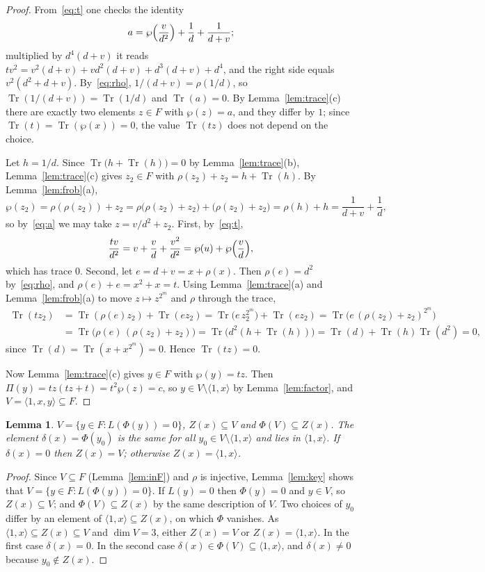 \documentclass[11pt,a4paper,reqno]{amsart}
\newtheorem{lemma}[theorem]{Lemma}
\theoremstyle{remark}
\numberwithin{equation}{section}
\newcommand{\Tr}{\operatorname{Tr}}
\begin{document}
\begin{proof}
From~\eqref{eq:t} one checks the identity
\begin{equation}\label{eq:a}
a=\wp\Bigl(\frac{v}{d^2}\Bigr)+\frac1d+\frac1{d+v};
\end{equation}
multiplied by $d^4(d+v)$ it reads $tv^2=v^2(d+v)+vd^2(d+v)+d^3(d+v)+d^4$, and the right side equals $v^2(d^2+d+v)$. By~\eqref{eq:rho}, $1/(d+v)=\rho(1/d)$, so $\Tr(1/(d+v))=\Tr(1/d)$ and $\Tr(a)=0$. By Lemma~\ref{lem:trace}(c) there are exactly two elements $z\in F$ with $\wp(z)=a$, and they differ by $1$; since $\Tr(t)=\Tr(\wp(x))=0$, the value $\Tr(tz)$ does not depend on the choice.

Let $h=1/d$. Since $\Tr\bigl(h+\Tr(h)\bigr)=0$ by Lemma~\ref{lem:trace}(b), Lemma~\ref{lem:trace}(c) gives $z_2\in F$ with $\rho(z_2)+z_2=h+\Tr(h)$. By Lemma~\ref{lem:frob}(a),
\[
\wp(z_2)=\rho(\rho(z_2))+z_2=\rho\bigl(\rho(z_2)+z_2\bigr)+\bigl(\rho(z_2)+z_2\bigr)=\rho(h)+h=\frac1{d+v}+\frac1d ,
\]
so by~\eqref{eq:a} we may take $z=v/d^2+z_2$. First, by~\eqref{eq:t},
\[
\frac{tv}{d^2}=v+\frac vd+\frac{v^2}{d^2}=\wp(u)+\wp\Bigl(\frac vd\Bigr),
\]
which has trace $0$. Second, let $e=d+v=x+\rho(x)$. Then $\rho(e)=d^2$ by~\eqref{eq:rho}, and $\rho(e)+e=x^2+x=t$. Using Lemma~\ref{lem:trace}(a) and Lemma~\ref{lem:frob}(a) to move $z\mapsto z^{2^m}$ and $\rho$ through the trace,
\begin{align*}
\Tr(tz_2)&=\Tr(\rho(e)z_2)+\Tr(ez_2)=\Tr\bigl(e\,z_2^{2^m}\bigr)+\Tr(ez_2)=\Tr\bigl(e\,(\rho(z_2)+z_2)^{2^m}\bigr)\\
&=\Tr\bigl(\rho(e)\,(\rho(z_2)+z_2)\bigr)=\Tr\bigl(d^2(h+\Tr(h))\bigr)=\Tr(d)+\Tr(h)\Tr(d^2)=0,
\end{align*}
since $\Tr(d)=\Tr(x+x^{2^m})=0$. Hence $\Tr(tz)=0$.

Now Lemma~\ref{lem:trace}(c) gives $y\in F$ with $\wp(y)=tz$. Then $\Pi(y)=tz(tz+t)=t^2\wp(z)=c$, so $y\in V\setminus\langle1,x\rangle$ by Lemma~\ref{lem:factor}, and $V=\langle1,x,y\rangle\subseteq F$.
\end{proof}

\begin{lemma}\label{lem:delta}
$V=\{y\in F: L(\Phi(y))=0\}$, $Z(x)\subseteq V$ and $\Phi(V)\subseteq Z(x)$. The element $\delta(x)=\Phi(y_0)$ is the same for all $y_0\in V\setminus\langle1,x\rangle$ and lies in $\langle1,x\rangle$. If $\delta(x)=0$ then $Z(x)=V$; otherwise $Z(x)=\langle1,x\rangle$.
\end{lemma}

\begin{proof}
Since $V\subseteq F$ (Lemma~\ref{lem:inF}) and $\rho$ is injective, Lemma~\ref{lem:key} shows that $V=\{y\in F: L(\Phi(y))=0\}$. If $L(y)=0$ then $\Phi(y)=0$ and $y\in V$, so $Z(x)\subseteq V$; and $\Phi(V)\subseteq Z(x)$ by the same description of $V$. Two choices of $y_0$ differ by an element of $\langle1,x\rangle\subseteq Z(x)$, on which $\Phi$ vanishes. As $\langle1,x\rangle\subseteq Z(x)\subseteq V$ and $\dim V=3$, either $Z(x)=V$ or $Z(x)=\langle1,x\rangle$. In the first case $\delta(x)=0$. In the second case $\delta(x)\in\Phi(V)\subseteq\langle1,x\rangle$, and $\delta(x)\ne0$ because $y_0\notin Z(x)$.
\end{proof}
\end{document}
